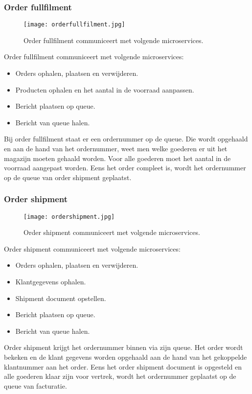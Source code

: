 \subsubsection{Order fullfilment}
\begin{figure}[h]
	\texttt{[image: orderfullfilment.jpg]}
	\caption{Order fullfilment communiceert met volgende microservices.}
	\centering
\end{figure}
Order fullfilment communiceert met volgende microservices:
\begin{itemize}
	\item Orders ophalen, plaatsen en verwijderen.
	\item Producten ophalen en het aantal in de voorraad aanpassen.
	\item Bericht plaatsen op queue.
	\item Bericht van queue halen.
\end{itemize}
Bij order fullfilment staat er een ordernummer op de queue. Die wordt opgehaald en aan de hand van het ordernummer, weet men welke goederen er uit het magazijn moeten gehaald worden. Voor alle goederen moet het aantal in de voorraad aangepast worden. Eens het order compleet is, wordt het ordernummer op de queue van order shipment geplaatst.

\subsubsection{Order shipment}
\begin{figure}[h]
	\texttt{[image: ordershipment.jpg]}
	\caption{Order shipment communiceert met volgende microservices.}
	\centering
\end{figure}
Order shipment communiceert met volgende microservices:
\begin{itemize}
	\item Orders ophalen, plaatsen en verwijderen.
	\item Klantgegevens ophalen.
	\item Shipment document opstellen.
	\item Bericht plaatsen op queue.
	\item Bericht van queue halen.
\end{itemize}
Order shipment krijgt het ordernummer binnen via zijn queue. Het order wordt bekeken en de klant gegevens worden opgehaald aan de hand van het gekoppelde klantnummer aan het order. Eens het order shipment document is opgesteld en alle goederen klaar zijn voor vertrek, wordt het ordernummer geplaatst op de queue van facturatie.

